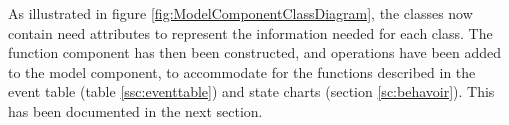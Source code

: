 As illustrated in figure \ref{fig:ModelComponentClassDiagram}, the classes now contain need attributes to represent the information needed for each class. The function component has then been constructed, and operations have been added to the model component, to accommodate for the functions described in the event table (table \ref{ssc:eventtable}) and state charts (section \ref{sc:behavoir}). This has been documented in the next section.